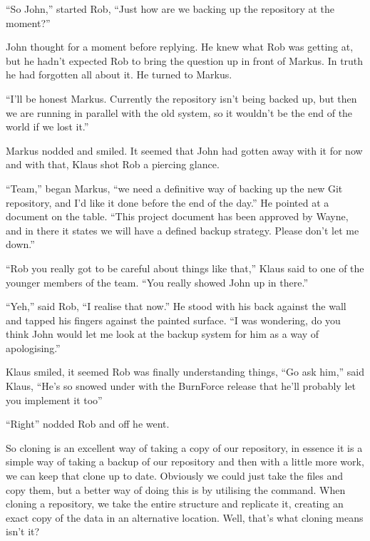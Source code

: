 \begin{trenches}
``So John,'' started Rob,
``Just how are we backing up the repository at the moment?''

John thought for a moment before replying.
He knew what Rob was getting at, but he hadn't expected Rob to bring the question up in front of Markus.
In truth he had forgotten all about it.
He turned to Markus.

``I'll be honest Markus. Currently the repository isn't being backed up, but then we are running in parallel with the old system, so it wouldn't be the end of the world if we lost it.''

Markus nodded and smiled.
It seemed that John had gotten away with it for now and with that, Klaus shot Rob a piercing glance.

``Team,'' began Markus,
``we need a definitive way of backing up the new Git repository, and I'd like it done before the end of the day.''
He pointed at a document on the table.
``This project document has been approved by Wayne, and in there it states we will have a defined backup strategy. Please don't let me down.''

\thoughtbreak

``Rob you really got to be careful about things like that,'' Klaus said to one of the younger members of the team.
``You really showed John up in there.''

``Yeh,'' said Rob,
``I realise that now.''
He stood with his back against the wall and tapped his fingers against the painted surface.
``I was wondering, do you think John would let me look at the backup system for him as a way of apologising.''

Klaus smiled, it seemed Rob was finally understanding things,
``Go ask him,'' said Klaus,
``He's so snowed under with the BurnForce release that he'll probably let you implement it too''

``Right'' nodded Rob and off he went.
\end{trenches}

So cloning is an excellent way of taking a copy of our repository, in essence it is a simple way of taking a backup of our repository and then with a little more work, we can keep that clone up to date.
Obviously we could just take the files and copy them, but a better way of doing this is by utilising the  command.
When cloning a repository, we take the entire structure and replicate it, creating an exact copy of the data in an alternative location.
Well, that's what cloning means isn't it?

